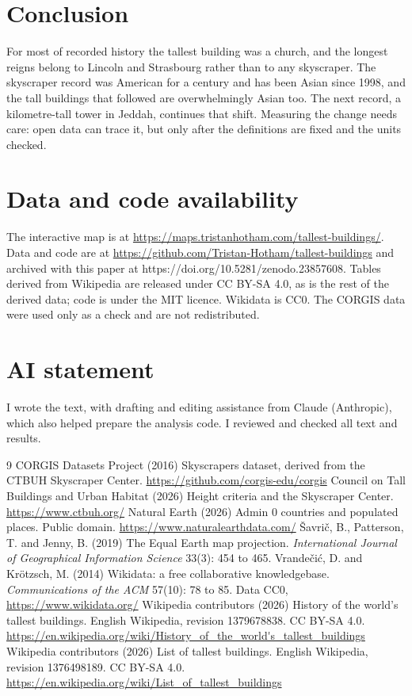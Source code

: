 \documentclass[11pt,a4paper]{article}
\begin{document}
\section{Conclusion}
For most of recorded history the tallest building was a church, and the longest reigns belong to Lincoln and Strasbourg rather than to any skyscraper. The skyscraper record was American for a century and has been Asian since 1998, and the tall buildings that followed are overwhelmingly Asian too. The next record, a kilometre-tall tower in Jeddah, continues that shift. Measuring the change needs care: open data can trace it, but only after the definitions are fixed and the units checked.

\section*{Data and code availability}
The interactive map is at \url{https://maps.tristanhotham.com/tallest-buildings/}. Data and code are at \url{https://github.com/Tristan-Hotham/tallest-buildings} and archived with this paper at https://doi.org/10.5281/zenodo.23857608. Tables derived from Wikipedia are released under CC BY-SA 4.0, as is the rest of the derived data; code is under the MIT licence. Wikidata is CC0. The CORGIS data were used only as a check and are not redistributed.

\section*{AI statement}
I wrote the text, with drafting and editing assistance from Claude (Anthropic), which also helped prepare the analysis code. I reviewed and checked all text and results.

\begin{thebibliography}{9}
 CORGIS Datasets Project (2016) Skyscrapers dataset, derived from the CTBUH Skyscraper Center. \url{https://github.com/corgis-edu/corgis}
 Council on Tall Buildings and Urban Habitat (2026) Height criteria and the Skyscraper Center. \url{https://www.ctbuh.org/}
 Natural Earth (2026) Admin 0 countries and populated places. Public domain. \url{https://www.naturalearthdata.com/}
 Šavrič, B., Patterson, T. and Jenny, B. (2019) The Equal Earth map projection. \emph{International Journal of Geographical Information Science} 33(3): 454 to 465.
 Vrandečić, D. and Krötzsch, M. (2014) Wikidata: a free collaborative knowledgebase. \emph{Communications of the ACM} 57(10): 78 to 85. Data CC0, \url{https://www.wikidata.org/}
 Wikipedia contributors (2026) History of the world's tallest buildings. English Wikipedia, revision 1379678838. CC BY-SA 4.0. \url{https://en.wikipedia.org/wiki/History_of_the_world's_tallest_buildings}
 Wikipedia contributors (2026) List of tallest buildings. English Wikipedia, revision 1376498189. CC BY-SA 4.0. \url{https://en.wikipedia.org/wiki/List_of_tallest_buildings}
\end{thebibliography}
\end{document}
